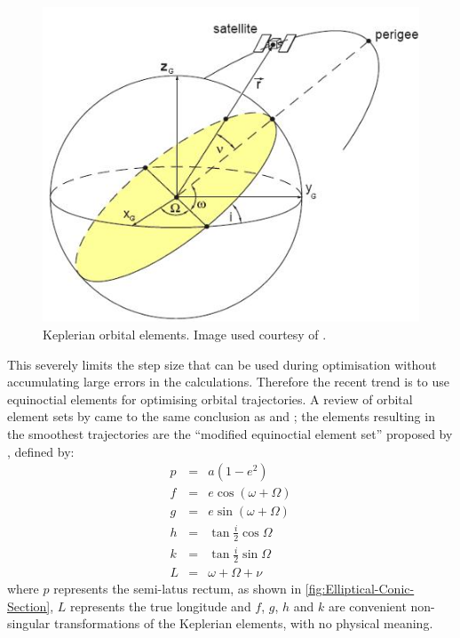 \begin{figure} [h]
\begin{center}
\includegraphics[scale=0.75]{Images/Keplerian-elements.JPG}
\end{center}
\caption{Keplerian orbital elements. Image used courtesy of \textcite{Keppeler_thesis}.}
\label{fig:Keplerian-Orbital-Elements}
\end{figure}

This severely limits the step size that can be used during optimisation without accumulating large errors in the calculations. Therefore the recent trend is to use equinoctial elements for optimising orbital trajectories. A review of orbital element sets by \textcite{Hintz2008} came to the same conclusion as \citeauthor{Letterio_thesis} and \citeauthor{Keppeler_thesis}; the elements resulting in the smoothest trajectories are the \enquote{modified equinoctial element set} proposed by \textcite{Walker1985}, defined by:
\begin{subequations}\label{eq:states}
\begin{eqnarray}
p & = & a(1-e^{2}) \label{eq:p}\\
f & = & e\cos(\omega+\Omega) \label{eq:f}\\
g & = & e\sin(\omega+\Omega) \label{eq:g}\\
h & = & \tan\frac{i}{2}\cos\Omega \label{eq:h}\\
k & = & \tan\frac{i}{2}\sin\Omega \label{eq:k}\\
L & = & \omega+\Omega+\nu \label{eq:L}
\end{eqnarray}
\end{subequations}
where $p$ represents the semi-latus rectum, as shown in \autoref{fig:Elliptical-Conic-Section}, $L$ represents the true longitude and $f$, $g$, $h$ and $k$ are convenient non-singular transformations of the Keplerian elements, with no physical meaning.

